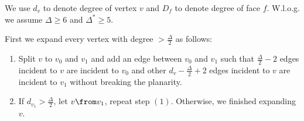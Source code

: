 \documentclass[11pt]{article}
\begin{document}
\begin{solution}
  We use \(d_v\) to denote degree of vertex \(v\) and \(D_f\) to denote degree of face \(f\). W.l.o.g. we assume \(\Delta\ge 6\) and \(\Delta^*\ge 5\).

  \noindent First we expand every vertex with degree \(>\frac{\Delta}{2}\) as follows:\vspace{-5pt}
  \begin{enumerate}[(V.1)]\itemsep0pt
  \item Split \(v\) to \(v_0\) and \(v_1\) and add an edge between \(v_0\) and \(v_1\) such that \(\frac{\Delta}{2}-2\) edges incident to \(v\) are incident to \(v_0\) and other \(d_v-\frac{\Delta}{2}+2\) edges incident to \(v\) are incident to \(v_1\) without breaking the planarity.
  \item If \(d_{v_1}>\frac{\Delta}{2}\), let \(v\from v_1\), repeat step \((1)\). Otherwise, we finished expanding \(v\).
  \end{enumerate}


\end{solution}
\end{document}
